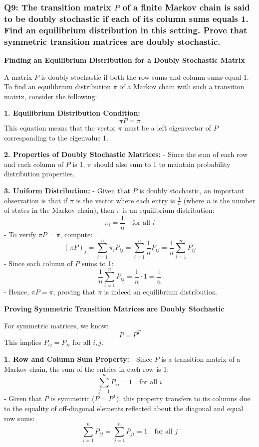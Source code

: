\documentclass[8pt]{article}
\begin{document}
\subsubsection*{Q9:
The transition matrix \(P\) of a finite Markov chain is said to be doubly stochastic if each of its column sums equals 1. Find an equilibrium distribution in this setting. Prove that symmetric transition matrices are doubly stochastic.}

\textbf{Finding an Equilibrium Distribution for a Doubly Stochastic Matrix}

A matrix \(P\) is doubly stochastic if both the row sums and column sums equal 1. To find an equilibrium distribution \(\pi\) of a Markov chain with such a transition matrix, consider the following:

\textbf{1. Equilibrium Distribution Condition:}
   \[
   \pi P = \pi
   \]
   This equation means that the vector \(\pi\) must be a left eigenvector of \(P\) corresponding to the eigenvalue 1.

\textbf{2. Properties of Doubly Stochastic Matrices:}
   - Since the sum of each row and each column of \(P\) is 1, \(\pi\) should also sum to 1 to maintain probability distribution properties. 

\textbf{3. Uniform Distribution:}
   - Given that \(P\) is doubly stochastic, an important observation is that if \(\pi\) is the vector where each entry is \(\frac{1}{n}\) (where \(n\) is the number of states in the Markov chain), then \(\pi\) is an equilibrium distribution:
     \[
     \pi_i = \frac{1}{n} \quad \text{for all } i
     \]
   - To verify \(\pi P = \pi\), compute:
     \[
     (\pi P)_j = \sum_{i=1}^n \pi_i P_{ij} = \sum_{i=1}^n \frac{1}{n} P_{ij} = \frac{1}{n} \sum_{i=1}^n P_{ij}
     \]
   - Since each column of \(P\) sums to 1:
     \[
     \frac{1}{n} \sum_{i=1}^n P_{ij} = \frac{1}{n} \cdot 1 = \frac{1}{n}
     \]
   - Hence, \(\pi P = \pi\), proving that \(\pi\) is indeed an equilibrium distribution.

\textbf{Proving Symmetric Transition Matrices are Doubly Stochastic}

For symmetric matrices, we know:
   \[
   P = P^T
   \]
This implies \(P_{ij} = P_{ji}\) for all \(i, j\).

\textbf{1. Row and Column Sum Property:}
   - Since \(P\) is a transition matrix of a Markov chain, the sum of the entries in each row is 1:
     \[
     \sum_{j=1}^n P_{ij} = 1 \quad \text{for all } i
     \]
   - Given that \(P\) is symmetric (\(P = P^T\)), this property transfers to its columns due to the equality of off-diagonal elements reflected about the diagonal and equal row sums:
     \[
     \sum_{i=1}^n P_{ij} = \sum_{j=1}^n P_{ji} = 1 \quad \text{for all } j
     \]
\end{document}
